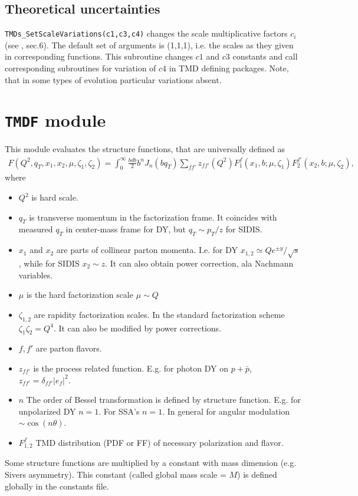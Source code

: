 \documentclass[prd,nofootinbib,eqsecnum,final]{revtex4}
\renewcommand{\(}{\left(}
\renewcommand{\)}{\right)}
\renewcommand{\[}{\left[}
\renewcommand{\]}{\right]}
\begin{document}
\subsection{Theoretical uncertainties}
\label{TMDs:c123}

\texttt{TMDs\_SetScaleVariations(c1,c3,c4)} changes the scale multiplicative factors $c_i$ (see \cite{Scimemi:2018xaf}, sec.6). The default set of arguments is (1,1,1), i.e. the scales as they given in corresponding functions. This subroutine changes $c1$ and $c3$ constants and call corresponding subroutines for variation of $c4$ in TMD defining packages. Note, that in some types of evolution particular variations absent.

\newpage

\section{\texttt{TMDF} module}
\label{TMDF}


This module evaluates the structure functions, that are universally defined as
\begin{eqnarray}\label{TMDF:F}
F(Q^2,q_T,x_1,x_2,\mu,\zeta_1,\zeta_2)=\int_0^\infty \frac{bdb}{2}b^n J_n(bq_T)\sum_{ff'} z_{ff'}(Q^2) F_1^f(x_1,b;\mu,\zeta_1)F_2^{f'}(x_2,b;\mu,\zeta_2),
\end{eqnarray}
where
\begin{itemize}
\item $Q^2$ is hard scale.
\item $q_T$ is transverse momentum in the factorization frame. It coincides with measured $q_T$ in center-mass frame for DY, but $q_T\sim p_T/z$ for SIDIS.
\item $x_1$ and $x_2$ are parts of collinear parton momenta. I.e. for DY $x_{1,2}\simeq Qe^{\pm y}/\sqrt{s}$, while for SIDIS $x_2\sim z$. It can also obtain power correction, ala Nachmann variables.
\item $\mu$ is the hard factorization scale $\mu \sim Q$
\item $\zeta_{1,2}$ are rapidity factorization scales. In the standard factorization scheme $\zeta_1\zeta_2=Q^4$. It can also be modified by power corrections.
\item $f,f'$ are parton flavors.
\item $z_{ff'}$ is the process related function. E.g. for photon DY on $p+\bar p$, $z_{ff'}=\delta_{ff'}|e_f|^2.$
\item $n$ The order of Bessel transformation is defined by structure function. E.g. for unpolarized DY $n=1$. For SSA's $n=1$. In general for angular modulation $\sim \cos (n\theta)$.
\item $F_{1,2}^f$ TMD distribution (PDF or FF) of necessary polarization and flavor.
\end{itemize}
Some structure functions are multiplied by a constant with mass dimension (e.g. Sivers asymmetry). This constant (called global mass scale = $M$) is defined globally in the constants file.
\end{document}

